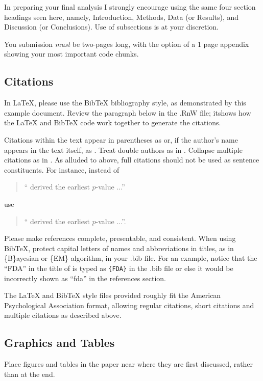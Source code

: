 \documentclass{article}\usepackage[]{graphicx}\usepackage[]{color}
\begin{document}
\begin{multicols}{2}
In preparing your final analysis I strongly encourage using the same four section headings seen here, namely, Introduction, Methods, Data (or Results), and Discussion (or Conclusions). Use of subsections is at your discretion.

You submission \emph{must} be two-pages long, with the option of a 1 page appendix showing your most important code chunks.

\subsection{Citations}
In \LaTeX, please use the Bib\TeX{} bibliography style, as demonstrated by this example document. Review the paragraph below in the .RnW file; itshows how the LaTeX and 
Bib\TeX{} code work together to generate the citations.

Citations within the text appear in parentheses as \citep{Nussbaum2018} or, if the author's name appears in the text itself, as \cite{Nussbaum2018}.  Treat double authors as in \cite{Wasserstein2016}. Collapse multiple citations as in \citep{Nussbaum2018,Wasserstein2016}. As alluded to above, full citations should not be used as sentence constituents.  For instance, instead of
\begin{quote}
  ``\cite{Arbuthnot1710} derived the earliest $p$-value ...''
\end{quote}
use
\begin{quote}
``\cite{Arbuthnot1710} derived the earliest $p$-value ...''.
\end{quote}
Please make references complete, presentable, and consistent. When using Bib\TeX{}, protect capital letters of names and abbreviations in titles, as in \{B\}ayesian or \{EM\} algorithm, in your .bib file.  For an example, notice that the ``FDA'' in the title of \cite{LaVange2019} is typed as \verb+{FDA}+ in the .bib file or else it would be incorrectly shown as ``fda'' in the references section.

The \LaTeX{} and Bib\TeX{} style files provided roughly fit the American Psychological Association format, allowing regular citations, short citations and multiple citations as described above.

\subsection{Graphics and Tables}
Place figures and tables in the paper near where they are first discussed, rather than at the end. 


\end{multicols}
\end{document}
